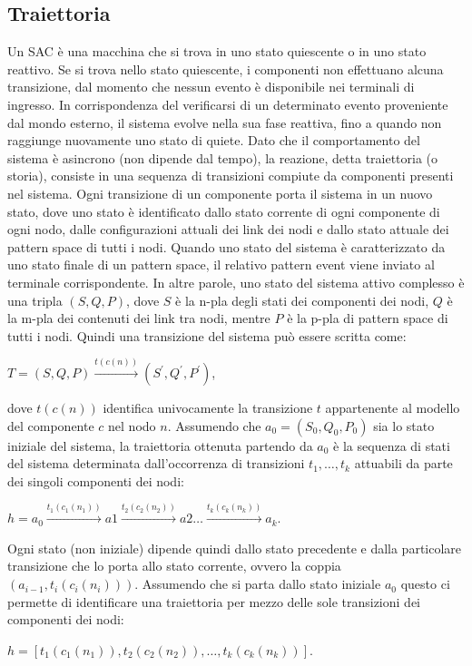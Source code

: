 \subsection{Traiettoria}
Un SAC è una macchina che si trova in uno stato quiescente o in uno stato reattivo. Se si trova nello stato quiescente, i componenti non effettuano alcuna transizione, dal momento che nessun evento è disponibile nei terminali di ingresso. In corrispondenza del verificarsi di un determinato evento proveniente dal mondo esterno, il sistema evolve nella sua fase reattiva, fino a quando non raggiunge nuovamente uno stato di quiete. Dato che il comportamento del sistema è asincrono (non dipende dal tempo), la reazione, detta traiettoria (o storia), consiste in una sequenza di transizioni compiute da componenti presenti nel sistema.
Ogni transizione di un componente porta il sistema in un nuovo stato, dove uno stato è identificato dallo stato corrente di ogni componente di ogni nodo, dalle configurazioni attuali dei link dei nodi e dallo stato attuale dei pattern space di tutti i nodi. Quando uno stato del sistema è caratterizzato da uno stato finale di un pattern space, il relativo pattern event viene inviato al terminale corrispondente.
In altre parole, uno stato del sistema attivo complesso è una tripla $(S,Q,P)$, dove $S$ è la n-pla degli stati dei componenti dei nodi, $Q$ è la m-pla dei contenuti dei link tra nodi, mentre $P$ è la p-pla di pattern space di tutti i nodi.
Quindi una transizione del sistema può essere scritta come:
\begin{center}
	$T = (S,Q,P) \xrightarrow {t(c(n))} (S^\prime,Q^\prime,P^\prime)$,
\end{center}
dove $t(c(n))$ identifica univocamente la transizione $t$ appartenente al modello del componente $c$ nel nodo $n$.
Assumendo che $a_0 = (S_0,Q_0,P_0)$ sia lo stato iniziale del sistema, la traiettoria ottenuta partendo da $a_0$ è la sequenza di stati del sistema determinata dall'occorrenza di transizioni $t_1, \ldots , t_k$ attuabili da parte dei singoli componenti dei nodi:
\begin{center}
$h = a_0 \xrightarrow{t_1(c_1(n_1))} a1 \xrightarrow{t_2(c_2(n_2))} a2 \ldots \xrightarrow{t_k(c_k(n_k))} a_k$.
\end{center}

Ogni stato (non iniziale) dipende quindi dallo stato precedente e dalla particolare transizione che lo porta allo stato corrente, ovvero la coppia $(a_{i-1},t_i(c_i(n_i)))$. Assumendo che si parta dallo stato iniziale $a_0$ questo ci permette di identificare una traiettoria per mezzo delle sole transizioni dei componenti dei nodi:
\begin{center}
$h = [t_1(c_1(n_1)),t_2(c_2(n_2)), \ldots , t_k(c_k(n_k))]$.
\end{center}


